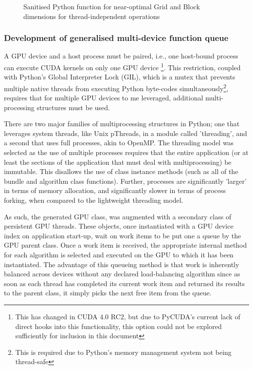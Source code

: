 \begin{figure}[H]
  
  \caption{Sanitised Python function for near-optimal Grid and Block dimensions for thread-independent operations}
  \label{fig:workload-calc}
\end{figure}

\subsubsection{Development of generalised multi-device function queue}
A GPU device and a host process must be paired, i.e., one host-bound process can execute CUDA kernels on only one GPU device \footnote{This has changed in CUDA 4.0 RC2, but due to PyCUDA's current lack of direct hooks into this functionality, this option could not be explored sufficiently for inclusion in this document}. This restriction, coupled with Python's Global Interpreter Lock (GIL), which is a mutex that prevents multiple native threads from executing Python byte-codes simultaneously\footnote{This is required due to Python's memory management system not being thread-safe}, requires that for multiple GPU devices to me leveraged, additional multi-processing structures must be used.

There are two major families of multiprocessing structures in Python; one that leverages system threads, like Unix pThreads, in a module called 'threading', and a second that uses full processes, akin to OpenMP. The threading model was selected as the use of multiple processes requires that the entire application (or at least the sections of the application that must deal with multiprocessing) be immutable. This disallows the use of class instance methods (such as all of the bundle and algorithm class functions). Further, processes are significantly 'larger' in terms of memory allocation, and significantly slower in terms of process forking, when compared to the lightweight threading model.

As such, the generated GPU class, was augmented with a secondary class of persistent GPU threads. These objects, once instantiated with a GPU device index on application start-up, wait on work items to be put one a queue by the GPU parent class. Once a work item is received, the appropriate internal method for each algorithm is selected and executed on the GPU to which it has been instantiated. The advantage of this queueing method is that work is inherently balanced across devices without any declared load-balancing algorithm since as soon as each thread has completed its current work item and returned its results to the parent class, it simply picks the next free item from the queue.

